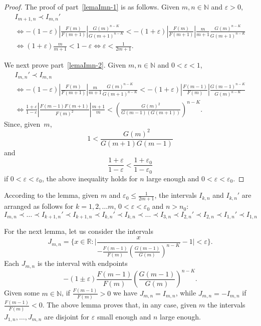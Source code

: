 \documentclass[10pt, a4paper, leqno]{amsart}
\numberwithin{equation}{section}
\theoremstyle{plain}
\theoremstyle{remark}
\newcommand{\RR}{\mathbb{R}}
\newcommand{\NN}{\mathbb{N}}
\newcommand{\eps}{\varepsilon}
\begin{document}
\begin{proof}
The proof of part~\eqref{lemaImn-1} is as follows. Given $m, n \in \NN$ and $\eps > 0$,
\begin{multline*}
  I_{m+1,n} \prec I_{m,n}'
  \\
  \iff
  -(1-\eps) \left|\frac{F(m)}{F(m+1)}\right| \frac{G(m)^{n-K}}{G(m+1)^{n-K}}
  < -(1+\eps) \left|\frac{F(m)}{F(m+1)}\right| \frac{m}{m+1}
  \frac{G(m)^{n-K}}{G(m+1)^{n-K}}
  \\
  \iff
  (1+\eps) \frac{m}{m+1} < 1-\eps
  \iff \eps < \frac{1}{2m+1}.
\end{multline*}

We next prove part~\eqref{lemaImn-2}. Given $m, n \in \NN$ and $0 < \eps < 1$,
\begin{multline*}
  I_{m,n}' \prec I_{m,n}
  \\
  \iff
  -(1-\eps) \left|\frac{F(m)}{F(m+1)}\right| \frac{m}{m+1}
  \frac{G(m)^{n-K}}{G(m+1)^{n-K}}
  < -(1+\eps) \left|\frac{F(m-1)}{F(m)}\right| \frac{G(m-1)^{n-K}}{G(m)^{n-K}}
  \\
  \iff \frac{1+\eps}{1-\eps}
  \left|\frac{F(m-1) F(m+1)}{F(m)^2}\right|
  \frac{m+1}{m}
  < \left(
  \frac{G(m)^2}
  {G(m-1) (G(m+1))}
  \right)^{n-K}.
\end{multline*}
Since, given~$m$,
\[
  1 < \frac{G(m)^2}{G(m+1) G(m-1)}
\]
and
\[
  \frac{1+\eps}{1-\eps} < \frac{1+\eps_0}{1-\eps_0}
\]
if $0 < \eps < \eps_0$,
the above inequality holds for $n$ large enough and $0 < \eps < \eps_0$.
\end{proof}

According to the lemma, given $m$ and $\eps_0 \le \frac{1}{2m+1}$, the intervals $I_{k,n}$ and $I_{k,n}'$ are arranged as follows for $k=1,2,\dots m$, $0 < \eps < \eps_0$ and $n > n_0$:
\[
  I_{m,n} \prec \dots \prec I_{k+1,n}' \prec I_{k+1,n} \prec I_{k,n}' \prec I_{k,n} \prec \dots \prec I_{3,n} \prec I_{2,n}' \prec I_{2,n} \prec I_{1,n}' \prec I_{1,n}
\]

For the next lemma, let us consider the intervals
\begin{equation}
\label{Jmn}
  J_{m,n} = \Bigg\{ x \in \RR : \Bigg| \frac{x}{-\frac{F(m-1)}{F(m)} 
   \left(\frac{G(m-1)}{G(m)}\right)^{n-K}} - 1 \Bigg| < \eps
  \Bigg\}.
\end{equation}
Each $J_{m,n}$ is the interval with endpoints
\[
  -(1 \pm \eps) \frac{F(m-1)}{F(m)} \left(\frac{G(m-1)}{G(m)}\right)^{n-K}.
\]
Given some $m \in \NN$, if $\frac{F(m-1)}{F(m)} > 0$ we have $J_{m,n} = I_{m,n}$, while $J_{m,n} = -I_{m,n}$ if $\frac{F(m-1)}{F(m)} < 0$. The above lemma proves that, in any case, given $m$ the intervals $J_{1,n}, \dots, J_{m,n}$ are disjoint for $\eps$ small enough and $n$ large enough.
\end{document}
